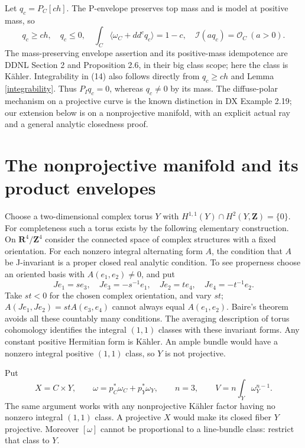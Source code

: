 \documentclass[11pt]{article}
\newcommand{\MI}{\mathcal I}
\newcommand{\OO}{\mathcal O}
\newcommand{\ddc}{dd^c}
\begin{document}
Let $q_c=P_C[ch]$. The P-envelope preserves top mass and is model
at positive mass, so
\[
 q_c\ge ch,\quad q_c\le0,\quad
 \int_C\langle\omega_C+\ddc q_c\rangle=1-c,
 \quad \MI(aq_c)=\OO_C\ (a>0).                             \tag{14}
\]
The mass-preserving envelope assertion and its positive-mass
idempotence are DDNL Section 2 and Proposition 2.6, in their big
class scope; here the class is K\"ahler. Integrability in (14)
also follows directly from $q_c\ge ch$ and Lemma \ref{integrability}.
Thus $P_Iq_c=0$, whereas $q_c\ne0$ by its mass. The diffuse-polar
mechanism on a projective curve is the known distinction in DX
Example 2.19; our extension below is on a nonprojective manifold,
with an explicit actual ray and a general analytic closedness proof.

\section{The nonprojective manifold and its product envelopes}
Choose a two-dimensional complex torus $Y$ with
$H^{1,1}(Y)\cap H^2(Y,\mathbf Z)=\{0\}$. For completeness such
a torus exists by the following elementary construction. On
$\mathbf R^4/\mathbf Z^4$ consider the connected space of complex
structures with a fixed orientation. For each nonzero integral
alternating form $A$, the condition that $A$ be J-invariant is a
proper closed real analytic condition. To see properness choose an
oriented basis with $A(e_1,e_2)\ne0$, and put
\[
 Je_1=s e_3,\quad Je_3=-s^{-1}e_1,\quad
 Je_2=t e_4,\quad Je_4=-t^{-1}e_2.
\]
Take $st<0$ for the chosen complex orientation, and vary $st$;
$A(Je_1,Je_2)=stA(e_3,e_4)$ cannot always equal $A(e_1,e_2)$.
Baire's theorem avoids all these countably many conditions.
The averaging description of torus cohomology identifies the
integral $(1,1)$ classes with these invariant forms. Any constant
positive Hermitian form is K\"ahler. An ample bundle would have a
nonzero integral positive $(1,1)$ class, so $Y$ is not projective.

Put
\[
 X=C\times Y,\qquad \omega=p_C^*\omega_C+p_Y^*\omega_Y,
 \qquad n=3,\qquad V=n\int_Y\omega_Y^{n-1}.                 \tag{15}
\]
The same argument works with any nonprojective K\"ahler factor
having no nonzero integral $(1,1)$ class. A projective $X$ would
make its closed fiber $Y$ projective. Moreover $[\omega]$ cannot
be proportional to a line-bundle class: restrict that class to $Y$.
\end{document}
